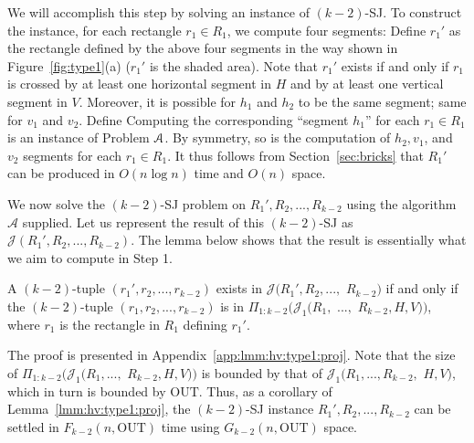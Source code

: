 \documentclass[sigconf]{acmart}
\def\vgap{\vspace{1mm}}
\def\A{\mathcal{A}}
\def\J{\mathcal{J}}
\def\out{\mathrm{OUT}}
\begin{document}
 We will accomplish this step by solving an instance of $(k-2)$-SJ. To construct the instance, for each rectangle $r_1 \in R_1$, we compute four segments:
Define $r_1'$ as the rectangle defined by the above four segments in the way shown in Figure~\ref{fig:type1}(a) ($r_1'$ is the shaded area). Note that $r_1'$ exists if and only if $r_1$ is crossed by at least one horizontal segment in $H$ and by at least one vertical segment in $V$. Moreover, it is possible for $h_1$ and $h_2$ to be the same segment; same for $v_1$ and $v_2$. Define
Computing the corresponding ``segment $h_1$'' for each $r_1 \in R_1$ is an instance of Problem $\EuScript{A}$. By symmetry, so is the computation of $h_2, v_1$, and $v_2$ segments for each $r_1 \in R_1$. It thus follows from Section~\ref{sec:bricks} that $R_1'$ can be produced in $O(n \log n)$ time and $O(n)$ space.

\vgap

We now solve the $(k-2)$-SJ problem on $R_1', R_2, ..., R_{k-2}$ using the algorithm $\A$ supplied. Let us represent the result of this $(k-2)$-SJ as $\J(R_1', R_2, ..., R_{k-2})$. The lemma below shows that the result is essentially what we aim to compute in Step 1.

\begin{lemma} \label{lmm:hv:type1:proj}
    A $(k-2)$-tuple $(r_1', r_2, ..., r_{k-2})$ exists in $\J(R_1', R_2, ...,$ $R_{k-2})$ if and only if the $(k-2)$-tuple $(r_1, r_2, ..., r_{k-2})$ is in $\Pi_{1:k-2}(\J_1(R_1,$ $...,$ $R_{k-2}, H, V))$, where $r_1$ is the rectangle in $R_1$ defining $r_1'$.
\end{lemma}

The proof is presented in Appendix~\ref{app:lmm:hv:type1:proj}. Note that the size of $\Pi_{1:k-2}(\J_1(R_1, ...,$ $R_{k-2}, H, V))$ is bounded by that of $\J_1(R_1, ..., R_{k-2},$ $H, V)$, which in turn is bounded by $\out$. Thus, as a corollary of Lemma~\ref{lmm:hv:type1:proj}, the $(k-2)$-SJ instance $R_1', R_2, ..., R_{k-2}$  can be settled in $F_{k-2}(n, \out)$ time using $G_{k-2}(n, \out)$ space.
\end{document}
